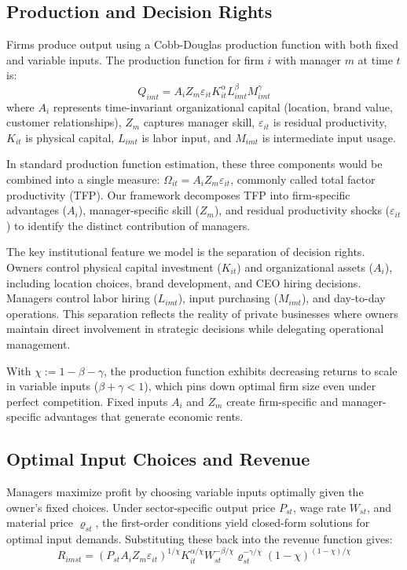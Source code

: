 \documentclass[11pt,a4paper]{article}
\begin{document}
\subsection{Production and Decision Rights}

Firms produce output using a Cobb-Douglas production function with both fixed and variable inputs. The production function for firm $i$ with manager $m$ at time $t$ is:
\begin{equation}\label{eq:production}
Q_{imt} = A_i Z_{m} \varepsilon_{it} K_{it}^\alpha L_{imt}^{\beta} M_{imt}^{\gamma}
\end{equation}
where $A_i$ represents time-invariant organizational capital (location, brand value, customer relationships), $Z_m$ captures manager skill, $\varepsilon_{it}$ is residual productivity, $K_{it}$ is physical capital, $L_{imt}$ is labor input, and $M_{imt}$ is intermediate input usage. 

In standard production function estimation, these three components would be combined into a single measure: $\Omega_{it} = A_i Z_m \varepsilon_{it}$, commonly called total factor productivity (TFP). Our framework decomposes TFP into firm-specific advantages ($A_i$), manager-specific skill ($Z_m$), and residual productivity shocks ($\varepsilon_{it}$) to identify the distinct contribution of managers. 

The key institutional feature we model is the separation of decision rights. Owners control physical capital investment ($K_{it}$) and organizational assets ($A_i$), including location choices, brand development, and CEO hiring decisions. Managers control labor hiring ($L_{imt}$), input purchasing ($M_{imt}$), and day-to-day operations. This separation reflects the reality of private businesses where owners maintain direct involvement in strategic decisions while delegating operational management.

With $\chi := 1 - \beta - \gamma$, the production function exhibits decreasing returns to scale in variable inputs ($\beta + \gamma < 1$), which pins down optimal firm size even under perfect competition. Fixed inputs $A_i$ and $Z_m$ create firm-specific and manager-specific advantages that generate economic rents.

\subsection{Optimal Input Choices and Revenue}

Managers maximize profit by choosing variable inputs optimally given the owner's fixed choices. Under sector-specific output price $P_{st}$, wage rate $W_{st}$, and material price $\varrho_{st}$, the first-order conditions yield closed-form solutions for optimal input demands. Substituting these back into the revenue function gives:
\begin{equation}\label{eq:revenue}
R_{imst} = (P_{st}A_i Z_m \varepsilon_{it})^{1/\chi}
K_{it}^{\alpha/\chi}
W_{st}^{-\beta/\chi}
\varrho_{st}^{-\gamma/\chi}
(1-\chi)^{(1-\chi)/\chi}
\end{equation}
\end{document}
